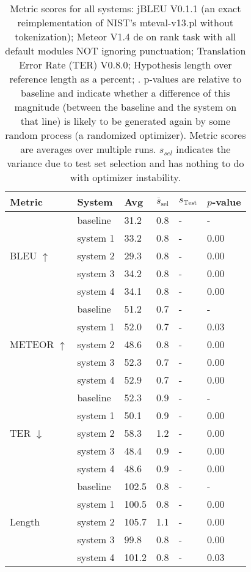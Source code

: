 \begin{table}[htb]
\begin{center}
\begin{footnotesize}
\begin{tabular}{|l|l|l|l|l|l|}
\hline
\bf Metric & \bf System & \bf Avg & \bf $\overline{s}_{\text{sel}}$ & \bf $s_{\text{Test}}$ & \bf $p$-value \\
\hline
\multirow{5}{*}{BLEU $\uparrow$}
& baseline & 31.2 & 0.8 & - & - \\
& system 1 & 33.2 & 0.8 & - & 0.00 \\
& system 2 & 29.3 & 0.8 & - & 0.00 \\
& system 3 & 34.2 & 0.8 & - & 0.00 \\
& system 4 & 34.1 & 0.8 & - & 0.00 \\
\hline
\multirow{5}{*}{METEOR $\uparrow$}
& baseline & 51.2 & 0.7 & - & - \\
& system 1 & 52.0 & 0.7 & - & 0.03 \\
& system 2 & 48.6 & 0.8 & - & 0.00 \\
& system 3 & 52.3 & 0.7 & - & 0.00 \\
& system 4 & 52.9 & 0.7 & - & 0.00 \\
\hline
\multirow{5}{*}{TER $\downarrow$}
& baseline & 52.3 & 0.9 & - & - \\
& system 1 & 50.1 & 0.9 & - & 0.00 \\
& system 2 & 58.3 & 1.2 & - & 0.00 \\
& system 3 & 48.4 & 0.9 & - & 0.00 \\
& system 4 & 48.6 & 0.9 & - & 0.00 \\
\hline
\multirow{5}{*}{Length }
& baseline & 102.5 & 0.8 & - & - \\
& system 1 & 100.5 & 0.8 & - & 0.00 \\
& system 2 & 105.7 & 1.1 & - & 0.00 \\
& system 3 & 99.8 & 0.8 & - & 0.00 \\
& system 4 & 101.2 & 0.8 & - & 0.03 \\
\hline
\end{tabular}
\end{footnotesize}
\end{center}
\caption{\label{tab:scores} Metric scores for all systems: jBLEU V0.1.1 (an exact reimplementation of NIST's mteval-v13.pl without tokenization); Meteor V1.4 de on rank task with all default modules NOT ignoring punctuation; Translation Error Rate (TER) V0.8.0; Hypothesis length over reference length as a percent; . p-values are relative to baseline and indicate whether a difference of this magnitude (between the baseline and the system on that line) is likely to be generated again by some random process (a randomized optimizer). Metric scores are averages over multiple runs. $s_{sel}$ indicates the variance due to test set selection and has nothing to do with optimizer instability.}
\end{table}
